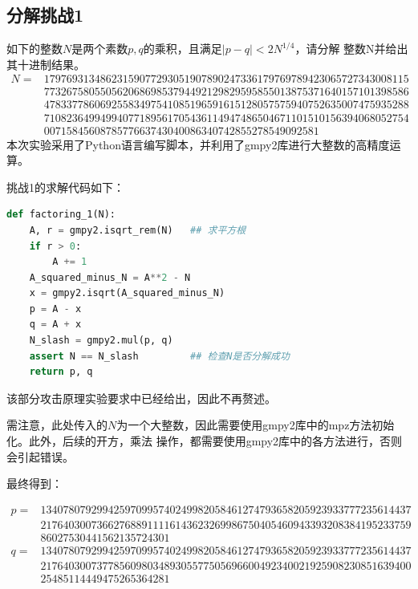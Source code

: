 \subsection{分解挑战1}

如下的整数$N$是两个素数$p,q$的乘积，且满足$|p-q|<2N^{1/4}$，请分解
整数N并给出其十进制结果。\\

$
\begin{aligned}
    N = &17976931348623159077293051907890247336179769789423065727343008115 \\
        & 77326758055056206869853794492129829595855013875371640157101398586 \\
        & 47833778606925583497541085196591615128057575940752635007475935288 \\
        & 71082364994994077189561705436114947486504671101510156394068052754 \\
        & 0071584560878577663743040086340742855278549092581
\end{aligned}
$\\

本次实验采用了Python语言编写脚本，并利用了gmpy2库进行大整数的高精度运算。

挑战1的求解代码如下：
\begin{lstlisting}[language = Python]
def factoring_1(N):
    A, r = gmpy2.isqrt_rem(N)   ## 求平方根
    if r > 0:
        A += 1
    A_squared_minus_N = A**2 - N
    x = gmpy2.isqrt(A_squared_minus_N)
    p = A - x
    q = A + x
    N_slash = gmpy2.mul(p, q)
    assert N == N_slash         ## 检查N是否分解成功
    return p, q
\end{lstlisting}

该部分攻击原理实验要求中已经给出，因此不再赘述。

需注意，此处传入的$N$为一个大整数，因此需要使用gmpy2库中的mpz方法初始化。此外，后续的开方，乘法
操作，都需要使用gmpy2库中的各方法进行，否则会引起错误。

最终得到：

$
\begin{aligned}
    p = &134078079299425970995740249982058461274793658205923933777235614437\\
        &217640300736627688911116143623269986750405460943393208384195233759\\
        &86027530441562135724301\\
    q = &134078079299425970995740249982058461274793658205923933777235614437\\
        &217640300737785609803489305577505696600492340021925908230851639400\\
        &25485114449475265364281
\end{aligned}
$\\

